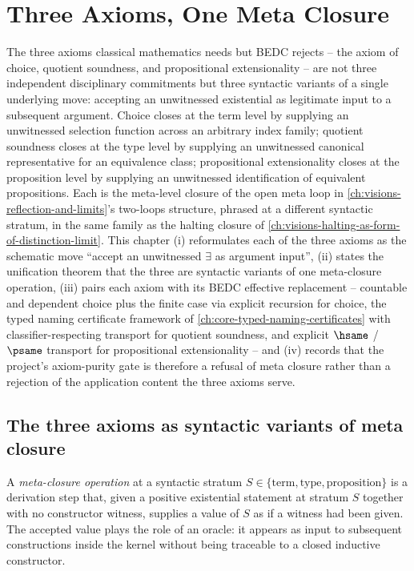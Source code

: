 \chapter{Three Axioms, One Meta Closure}
\label{ch:visions-three-axioms-one-closure}

The three axioms classical mathematics needs but BEDC rejects -- the axiom of choice, quotient soundness, and propositional extensionality -- are not three independent disciplinary commitments but three syntactic variants of a single underlying move: accepting an unwitnessed existential as legitimate input to a subsequent argument. Choice closes at the term level by supplying an unwitnessed selection function across an arbitrary index family; quotient soundness closes at the type level by supplying an unwitnessed canonical representative for an equivalence class; propositional extensionality closes at the proposition level by supplying an unwitnessed identification of equivalent propositions. Each is the meta-level closure of the open meta loop in \autoref{ch:visions-reflection-and-limits}'s two-loops structure, phrased at a different syntactic stratum, in the same family as the halting closure of \autoref{ch:visions-halting-as-form-of-distinction-limit}. This chapter (i) reformulates each of the three axioms as the schematic move ``accept an unwitnessed $\exists$ as argument input'', (ii) states the unification theorem that the three are syntactic variants of one meta-closure operation, (iii) pairs each axiom with its BEDC effective replacement -- countable and dependent choice plus the finite case via explicit recursion for choice, the typed naming certificate framework of \autoref{ch:core-typed-naming-certificates} with classifier-respecting transport for quotient soundness, and explicit $\hsame$ / $\psame$ transport for propositional extensionality -- and (iv) records that the project's axiom-purity gate is therefore a refusal of meta closure rather than a rejection of the application content the three axioms serve.

\section{The three axioms as syntactic variants of meta closure}
\label{sec:three-axioms-one-closure-variants}

\begin{definition}
\label{def:three-axioms-meta-closure-operation}
A \emph{meta-closure operation} at a syntactic stratum $S \in \{\text{term}, \text{type}, \text{proposition}\}$ is a derivation step that, given a positive existential statement at stratum $S$ together with no constructor witness, supplies a value of $S$ as if a witness had been given. The accepted value plays the role of an oracle: it appears as input to subsequent constructions inside the kernel without being traceable to a closed inductive constructor.
\end{definition}

